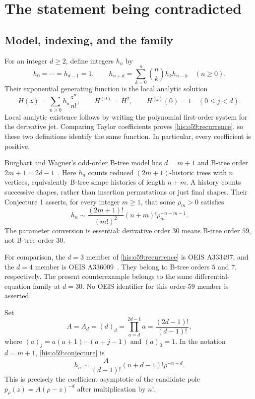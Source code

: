 \documentclass[11pt]{article}
\theoremstyle{remark}\newtheorem{remark}[theorem]{Remark}
\newcommand{\rise}[2]{(#1)_{#2}}
\numberwithin{equation}{section}
\begin{document}
\section{The statement being contradicted}\label{his:o59:sec:statement}
\subsection{Model, indexing, and the family}
For an integer $d\ge2$, define integers $h_n$ by
\begin{equation}\label{his:o59:recurrence}
h_0=\cdots=h_{d-1}=1,\qquad
h_{n+d}=\sum_{k=0}^{n}\binom nk h_kh_{n-k}\quad(n\ge0).
\end{equation}
Their exponential generating function is the local analytic solution
\begin{equation}\label{his:o59:ivp}
H(z)=\sum_{n\ge0}h_n\frac{z^n}{n!},\qquad
H^{(d)}=H^2,\qquad H^{(j)}(0)=1\quad(0\le j<d).
\end{equation}
Local analytic existence follows by writing the polynomial first-order
system for the derivative jet. Comparing Taylor coefficients proves
\eqref{his:o59:recurrence}, so these two definitions identify the same function.
In particular, every coefficient is positive.

Burghart and Wagner's odd-order B-tree model has $d=m+1$ and B-tree
order $2m+1=2d-1$~\cite[Section 4, equation (4)]{bw2026}.
Here $h_n$ counts reduced $(2m+1)$-historic trees with $n$ vertices,
equivalently B-tree shape histories of length $n+m$. A history counts
successive shapes, rather than insertion permutations or just final
shapes. Their Conjecture 1 asserts, for every integer $m\ge1$, that
some $\rho_m>0$ satisfies
\begin{equation}\label{his:o59:conjecture}
h_n\sim\frac{(2m+1)!}{(m!)^2}(n+m)!\rho_m^{-n-m-1}.
\end{equation}
The parameter conversion is essential: derivative order $30$ means
B-tree order $59$, not B-tree order $30$.

For comparison, the $d=3$ member of \eqref{his:o59:recurrence} is
OEIS A333497, and the $d=4$ member is OEIS A336009~\cite{oeis,oeisr4}.
They belong to B-tree orders $5$ and $7$, respectively. The present
counterexample belongs to the same differential-equation family at
$d=30$. No OEIS identifier for this order-$59$ member is asserted.

Set
\begin{equation}\label{his:o59:Adef}
A=A_d=\rise d d=\prod_{a=d}^{2d-1}a
=\frac{(2d-1)!}{(d-1)!},
\end{equation}
where $\rise a j=a(a+1)\cdots(a+j-1)$ and $\rise a0=1$.
In the notation $d=m+1$, \eqref{his:o59:conjecture} is
\begin{equation}\label{his:o59:conjecture-d}
h_n\sim\frac{A}{(d-1)!}(n+d-1)!\rho^{-n-d}.
\end{equation}
This is precisely the coefficient asymptotic of the candidate pole
$p_\rho(z)=A(\rho-z)^{-d}$ after multiplication by $n!$.
\end{document}
